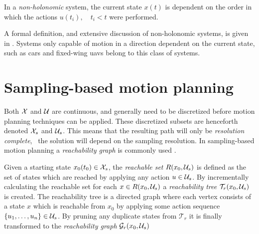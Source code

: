 \begin{definition}
    In a \textit{non-holonomic} system, the current state $x(t)$ is dependent 
    on the order in which the actions $u(t_i),\quad t_i<t$ were performed.
\end{definition}

A formal definition, and extensive discussion of non-holonomic systems, is given 
in \cite[Chapter~15]{planning_algorithms}. Systems only capable of motion in a direction 
dependent on the current state, such as cars and fixed-wing \acp{uav} belong to this class of systems.

\section{Sampling-based motion planning}
Both $\mathcal{X}$ and $\mathcal{U}$ are continuous, and generally need to be discretized 
before motion planning techniques can be applied. These discretized subsets are henceforth denoted $\mathcal{X}_s$ and $\mathcal{U}_s$. This means that the resulting path will only be \textit{resolution complete}, \ie\  
the solution will depend on the sampling resolution. In sampling-based
motion planning a \textit{reachability graph} is commonly used \cite{planning_algorithms}.

\begin{definition}\label{def:reach_graph}
    Given a starting state $x_0(t_0)\in\mathcal{X}_s$, the \textit{reachable set} 
    $R(x_0, \mathcal{U}_s)$ is defined as the set of states which are reached by applying any action $u\in\mathcal{U}_s$.
    By incrementally calculating the reachable set for each $x\in R(x_0, \mathcal{U}_s)$ a \textit{reachability tree} $\mathcal{T}_r(x_0, \mathcal{U}_s)$ is created.
    The reachability tree is a directed graph where each vertex consists of a state $x$ which is reachable from $x_0$ by applying some action sequence 
    $\{u_1,\hdots,u_n\}\in\mathcal{U}_s$. By pruning any duplicate states from $\mathcal{T}_r$ it is finally transformed to the \textit{reachability graph} $\mathcal{G}_r(x_0, \mathcal{U}_s)$
\end{definition}

